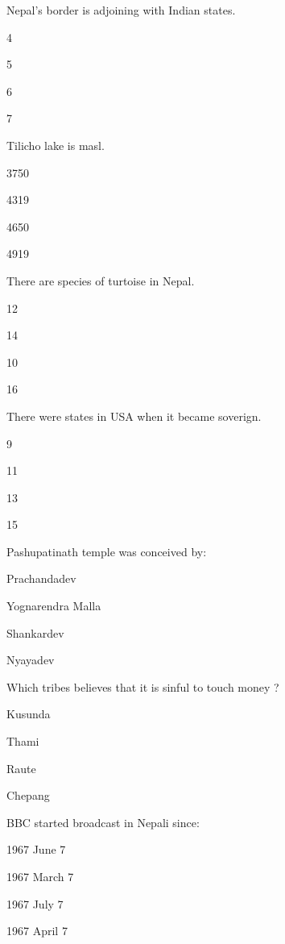 \begin{questions}
\question Nepal's border is adjoining with \fillin[][2cm] Indian states.
  \begin{items}
  \item 4
  \item 5
  \item 6
  \item 7
  \end{items}

\question Tilicho lake is \fillin[][2cm] masl.
  \begin{items}
  \item 3750
  \item 4319
  \item 4650
  \item 4919
  \end{items}

\question There are \fillin[][2cm] species of turtoise in Nepal.
  \begin{items}
  \item 12
  \item 14
  \item 10
  \item 16
  \end{items}

\question There were \fillin[][2cm] states in USA when it became soverign.
  \begin{items}
  \item 9
  \item 11
  \item 13
  \item 15
  \end{items}

\question Pashupatinath temple was conceived by:
  \begin{items}
  \item Prachandadev
  \item Yognarendra Malla
  \item Shankardev
  \item Nyayadev
  \end{items}

\question Which tribes believes that it is sinful to touch money ?
  \begin{items}
  \item Kusunda
  \item Thami
  \item Raute
  \item Chepang
  \end{items}

\question BBC started broadcast in Nepali since:
  \begin{items}
  \item 1967 June 7
  \item 1967 March 7
  \item 1967 July 7
  \item 1967 April 7
  \end{items}


\end{questions}
